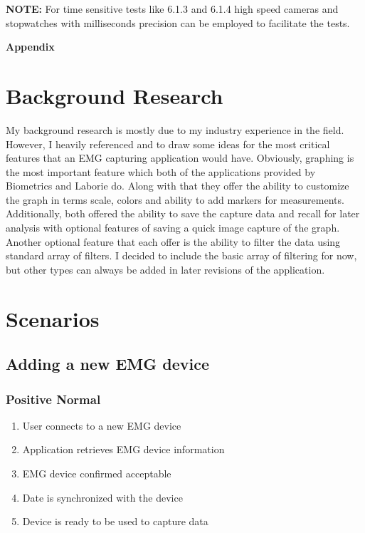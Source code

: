 \documentclass[12pt,a4paper]{article}
\begin{document}
\textbf{NOTE:} For time sensitive tests like 6.1.3 and 6.1.4 high speed cameras and stopwatches with milliseconds precision can be employed to facilitate the tests.

\newpage

\begin{flushleft}
\textbf{{\Large Appendix}}
\end{flushleft}
\appendix
\section{Background Research}

My background research is mostly due to my industry experience in the field. However, I heavily referenced \cite{Biometrics} and \cite{Laborie}
to draw some ideas for the most critical features that an EMG capturing application would have. Obviously, graphing is the most important feature
which both of the applications provided by Biometrics and Laborie do. Along with that they offer the ability to customize the graph in terms scale,
colors and ability to add markers for measurements. Additionally, both offered the ability to save the capture data and recall for later analysis 
with optional features of saving a quick image capture of the graph. Another optional feature that each offer is the ability to filter the data using
standard array of filters. I decided to include the basic array of filtering for now, but other types can always be added in later revisions of the application. 

\newpage

\section{Scenarios}

\subsection{Adding a new EMG device}

\subsubsection{Positive Normal}

\begin{enumerate}
	\item User connects to a new EMG device
	\item Application retrieves EMG device information
	\item EMG device confirmed acceptable
	\item Date is synchronized with the device
	\item Device is ready to be used to capture data
\end{enumerate}
\end{document}
